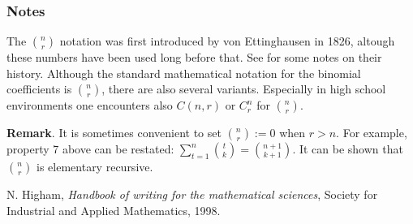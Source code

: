 \documentclass{article}
\begin{document}
\subsubsection*{Notes} 
The ${n\choose r}$ notation was first introduced by 
von Ettinghausen \cite{Higham} in 1826, altough
these numbers have been used long before that. See 
 for some notes on their history. 
Although the standard mathematical notation for the binomial coefficients is $n\choose r$, there
are also several variants. Especially in high school environments one encounters also 
${C}(n,r)$ or ${C}^n_r$ for ${n\choose r}$.

\textbf{Remark}.  It is sometimes convenient to set ${n \choose r}:=0$ when $r>n$.  For example, property 7 above can be restated: $\sum_{t=1}^n {t\choose k }={n+1\choose k+1}$.  It can be shown that ${n \choose r}$ is elementary recursive.
  
\begin{thebibliography}{9}
 N. Higham, \emph{Handbook of writing for the mathematical sciences},
Society for Industrial and Applied Mathematics, 1998. 
\end{thebibliography}
\end{document}
